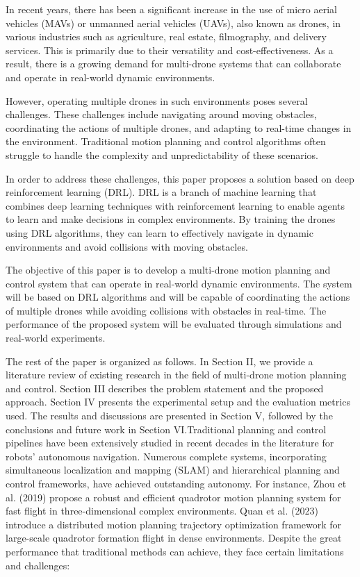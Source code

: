 In recent years, there has been a significant increase in the use of micro aerial vehicles (MAVs) or unmanned aerial vehicles (UAVs), also known as drones, in various industries such as agriculture, real estate, filmography, and delivery services. This is primarily due to their versatility and cost-effectiveness. As a result, there is a growing demand for multi-drone systems that can collaborate and operate in real-world dynamic environments.

However, operating multiple drones in such environments poses several challenges. These challenges include navigating around moving obstacles, coordinating the actions of multiple drones, and adapting to real-time changes in the environment. Traditional motion planning and control algorithms often struggle to handle the complexity and unpredictability of these scenarios.

In order to address these challenges, this paper proposes a solution based on deep reinforcement learning (DRL). DRL is a branch of machine learning that combines deep learning techniques with reinforcement learning to enable agents to learn and make decisions in complex environments. By training the drones using DRL algorithms, they can learn to effectively navigate in dynamic environments and avoid collisions with moving obstacles.

The objective of this paper is to develop a multi-drone motion planning and control system that can operate in real-world dynamic environments. The system will be based on DRL algorithms and will be capable of coordinating the actions of multiple drones while avoiding collisions with obstacles in real-time. The performance of the proposed system will be evaluated through simulations and real-world experiments.

The rest of the paper is organized as follows. In Section II, we provide a literature review of existing research in the field of multi-drone motion planning and control. Section III describes the problem statement and the proposed approach. Section IV presents the experimental setup and the evaluation metrics used. The results and discussions are presented in Section V, followed by the conclusions and future work in Section VI.Traditional planning and control pipelines have been extensively studied in recent decades in the literature for robots' autonomous navigation. Numerous complete systems, incorporating simultaneous localization and mapping (SLAM) and hierarchical planning and control frameworks, have achieved outstanding autonomy. For instance, Zhou et al. (2019) propose a robust and efficient quadrotor motion planning system for fast flight in three-dimensional complex environments. Quan et al. (2023) introduce a distributed motion planning trajectory optimization framework for large-scale quadrotor formation flight in dense environments. Despite the great performance that traditional methods can achieve, they face certain limitations and challenges:

